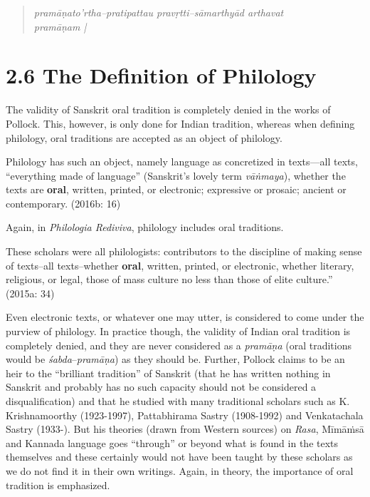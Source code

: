 \begin{verse}
\textit{pramāṇato'rtha–pratipattau pravṛtti–sāmarthyād arthavat\\ pramāṇam |}
\end{verse}


\section*{2.6 The Definition of Philology}

The validity of Sanskrit oral tradition is completely denied in the works of Pollock. This, however, is only done for Indian tradition, whereas when defining philology, oral traditions are accepted as an object of philology.

\begin{myquote}
Philology has such an object, namely language as concretized in texts—all texts, “everything made of language” (Sanskrit’s lovely term \textit{vāṅmaya}), whether the texts are \textbf{oral}, written, printed, or electronic; expressive or prosaic; ancient or contemporary. (2016b: 16)
\end{myquote}

Again, in \textit{Philologia Rediviva}, philology includes oral traditions.

\begin{myquote}
These scholars were all philologists: contributors to the discipline of making sense of texts–all texts–whether \textbf{oral}, written, printed, or electronic, whether literary, religious, or legal, those of mass culture no less than those of elite culture.” (2015a: 34)
\end{myquote}

Even electronic texts, or whatever one may utter, is considered to come under the purview of philology. In practice though, the validity of Indian oral tradition is completely denied, and they are never considered as a \textit{pramāṇa} (oral traditions would be \textit{śabda}–\textit{pramāṇa}) as they should be. Further, Pollock claims to be an heir to the “brilliant tradition” of Sanskrit (that he has written nothing in Sanskrit and probably has no such capacity should not be considered a disqualification) and that he studied with many traditional scholars such as K. Krishnamoorthy (1923-1997), Pattabhirama Sastry (1908-1992) and Venkatachala Sastry (1933-). But his theories (drawn from Western sources) on \textit{Rasa}, Mīmāṁsā and Kannada language goes “through” or beyond what is found in the texts themselves and these certainly would not have been taught by these scholars as we do not find it in their own writings. Again, in theory, the importance of oral tradition is emphasized.

